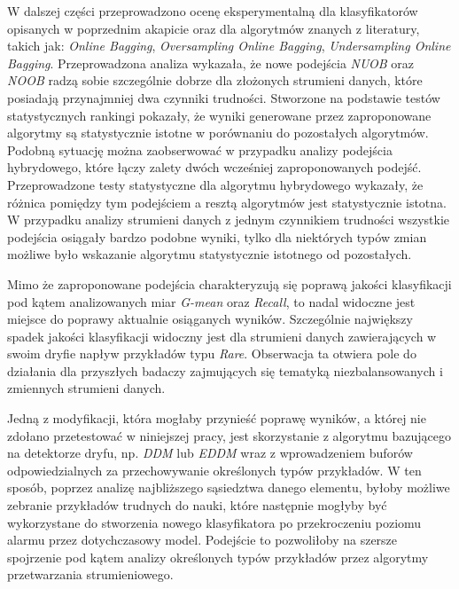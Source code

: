 W dalszej części przeprowadzono ocenę eksperymentalną dla klasyfikatorów opisanych w poprzednim akapicie oraz dla algorytmów znanych z literatury, takich jak: \textit{Online Bagging}, \textit{Oversampling Online Bagging}, \textit{Undersampling Online Bagging}. Przeprowadzona analiza wykazała, że nowe podejścia \textit{NUOB} oraz \textit{NOOB} radzą sobie szczególnie dobrze dla złożonych strumieni danych, które posiadają przynajmniej dwa czynniki trudności. Stworzone na podstawie testów statystycznych rankingi pokazały, że wyniki generowane przez zaproponowane algorytmy są statystycznie istotne w porównaniu do pozostałych algorytmów. Podobną sytuację można zaobserwować w przypadku analizy podejścia hybrydowego, które łączy zalety dwóch wcześniej zaproponowanych podejść. Przeprowadzone testy statystyczne dla algorytmu hybrydowego wykazały, że różnica pomiędzy tym podejściem a resztą algorytmów jest statystycznie istotna. W przypadku analizy strumieni danych z jednym czynnikiem trudności wszystkie podejścia osiągały bardzo podobne wyniki, tylko dla niektórych typów zmian możliwe było wskazanie algorytmu statystycznie istotnego od pozostałych.

Mimo że zaproponowane podejścia charakteryzują się poprawą jakości klasyfikacji pod kątem analizowanych miar \textit{G-mean} oraz \textit{Recall}, to nadal widoczne jest miejsce do poprawy aktualnie osiąganych wyników. Szczególnie największy spadek jakości klasyfikacji widoczny jest dla strumieni danych zawierających w swoim dryfie napływ przykładów typu \textit{Rare}. Obserwacja ta otwiera pole do działania dla przyszłych badaczy zajmujących się tematyką niezbalansowanych i zmiennych strumieni danych.

Jedną z modyfikacji, która mogłaby przynieść poprawę wyników, a której nie zdołano przetestować w niniejszej pracy, jest skorzystanie z algorytmu bazującego na detektorze dryfu, np. \textit{DDM} lub \textit{EDDM} wraz z wprowadzeniem buforów odpowiedzialnych za przechowywanie określonych typów przykładów. W ten sposób, poprzez analizę najbliższego sąsiedztwa danego elementu, byłoby możliwe zebranie przykładów trudnych do nauki, które następnie mogłyby być wykorzystane do stworzenia nowego klasyfikatora po przekroczeniu poziomu alarmu przez dotychczasowy model. Podejście to pozwoliłoby na szersze spojrzenie pod kątem analizy określonych typów przykładów przez algorytmy przetwarzania strumieniowego.